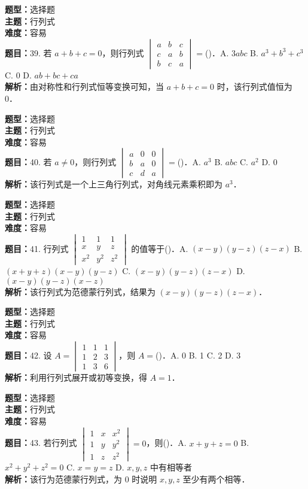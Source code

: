 \documentclass{ctexart}
\newenvironment{question}[5]{%
	\noindent\textbf{题型：}#1\\
	\textbf{主题：}#2\\
	\textbf{难度：}#3\\
	\textbf{题目：}#4\\
	\textbf{解析：}#5\\
	\vspace{1em}
}{}
\begin{document}
	
	\begin{question}
		{选择题}
		{行列式}
		{容易}
		{39. 若 \(a+b+c=0\)，则行列式 \(\begin{vmatrix} a & b & c \\ c & a & b \\ b & c & a\end{vmatrix}=\)(\qquad)．A. \(3abc\) B. \(a^3+b^3+c^3\) C. 0 D. \(ab+bc+ca\)}
		{由对称性和行列式恒等变换可知，当 \(a+b+c=0\) 时，该行列式值恒为 0．}
	\end{question}
	
	\begin{question}
		{选择题}
		{行列式}
		{容易}
		{40. 若 \(a \neq 0\)，则行列式 \(\begin{vmatrix} a & 0 & 0 \\ b & a & 0 \\ c & d & a\end{vmatrix}=\)(\qquad)．A. \(a^3\) B. \(abc\) C. \(a^2\) D. 0}
		{该行列式是一个上三角行列式，对角线元素乘积即为 \(a^3\)．}
	\end{question}
	
	\begin{question}
		{选择题}
		{行列式}
		{容易}
		{41. 行列式 \(\begin{vmatrix} 1 & 1 & 1 \\ x & y & z \\ x^2 & y^2 & z^2\end{vmatrix}\) 的值等于(\qquad)．A. \((x-y)(y-z)(z-x)\) B. \((x+y+z)(x-y)(y-z)\) C. \((x-y)(y-z)(z-x)\) D. \((x-y)(y-z)(x-z)\)}
		{该行列式为范德蒙行列式，结果为 \((x - y)(y - z)(z - x)\)．}
	\end{question}
	
	\begin{question}
		{选择题}
		{行列式}
		{容易}
		{42. 设 \(A=\begin{vmatrix} 1 & 1 & 1 \\ 1 & 2 & 3 \\ 1 & 3 & 6\end{vmatrix}\)，则 \(A=\)(\qquad)．A. 0 B. 1 C. 2 D. 3}
		{利用行列式展开或初等变换，得 \(A=1\)．}
	\end{question}
	
	\begin{question}
		{选择题}
		{行列式}
		{容易}
		{43. 若行列式 \(\begin{vmatrix} 1 & x & x^2 \\ 1 & y & y^2 \\ 1 & z & z^2\end{vmatrix}=0\)，则(\qquad)．A. \(x+y+z=0\) B. \(x^2+y^2+z^2=0\) C. \(x=y=z\) D. \(x,y,z\) 中有相等者}
		{该行为范德蒙行列式，为 0 时说明 \(x,y,z\) 至少有两个相等．}
	\end{question}
	
\end{document}
